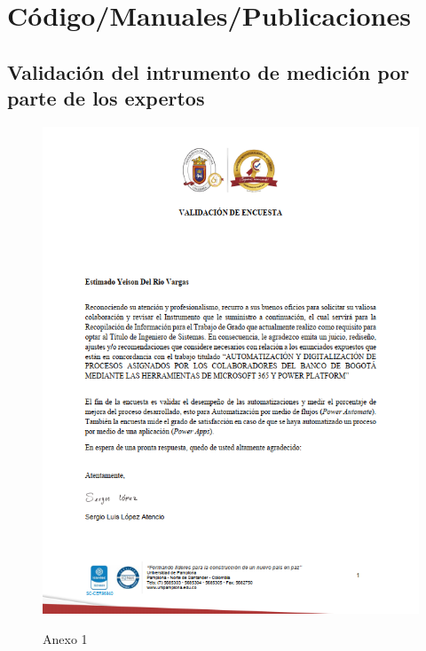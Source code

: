\chapter{Código/Manuales/Publicaciones}

\section{Validación del intrumento de medición por parte de los expertos}

\begin{figure}[H]
	\centering
	\includegraphics[scale=0.4]{Capitulo6/1}
	\label{anexo1}
	\caption{Anexo 1}
\end{figure}

